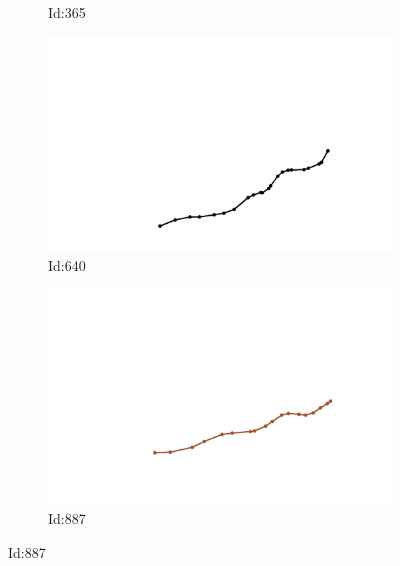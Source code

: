 \documentclass[12pt,twoside]{report}
\begin{document}
\begin{figure}
\begin{subfigure}[b]{0.20\textwidth}
\caption{Id:365}
\end{subfigure}
\begin{subfigure}[b]{0.20\textwidth}
\centering
\includegraphics[width=\textwidth]{../../trajectories/640.png}
\caption{Id:640}
\end{subfigure}
\begin{subfigure}[b]{0.20\textwidth}
\centering
\includegraphics[width=\textwidth]{../../trajectories/887.png}
\caption{Id:887}
\end{subfigure}
\end{figure}
\end{document}
